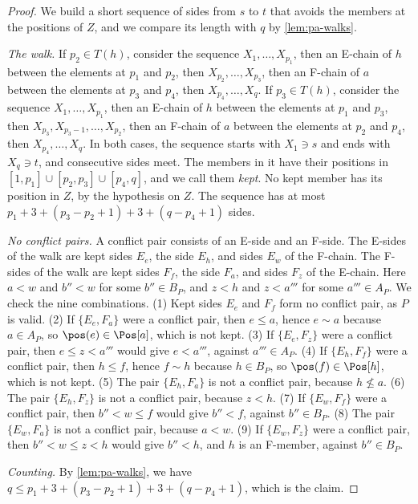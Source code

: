 \begin{proof}
We build a short sequence of sides from $s$ to $t$ that avoids the members at the positions of $Z$, and we compare its length with $q$ by \cref{lem:pa-walks}.

\emph{The walk.}
If $p_2 \in T(h)$, consider the sequence $X_1, \dots, X_{p_1}$, then an E-chain of $h$ between the elements at $p_1$ and $p_2$, then $X_{p_2}, \dots, X_{p_3}$, then an F-chain of $a$ between the elements at $p_3$ and $p_4$, then $X_{p_4}, \dots, X_q$.
If $p_3 \in T(h)$, consider the sequence $X_1, \dots, X_{p_1}$, then an E-chain of $h$ between the elements at $p_1$ and $p_3$, then $X_{p_3}, X_{p_3 - 1}, \dots, X_{p_2}$, then an F-chain of $a$ between the elements at $p_2$ and $p_4$, then $X_{p_4}, \dots, X_q$.
In both cases, the sequence starts with $X_1 \ni s$ and ends with $X_q \ni t$, and consecutive sides meet.
The members in it have their positions in $[1, p_1] \cup [p_2, p_3] \cup [p_4, q]$, and we call them \emph{kept}.
No kept member has its position in $Z$, by the hypothesis on $Z$.
The sequence has at most $p_1 + 3 + (p_3 - p_2 + 1) + 3 + (q - p_4 + 1)$ sides.

\emph{No conflict pairs.}
A conflict pair consists of an E-side and an F-side.
The E-sides of the walk are kept sides $E_e$, the side $E_h$, and sides $E_w$ of the F-chain.
The F-sides of the walk are kept sides $F_f$, the side $F_a$, and sides $F_z$ of the E-chain.
Here $a < w$ and $b'' < w$ for some $b'' \in B_P$, and $z < h$ and $z < a'''$ for some $a''' \in A_P$.
We check the nine combinations.
(1) Kept sides $E_e$ and $F_f$ form no conflict pair, as $P$ is valid.
(2) If $\{E_e, F_a\}$ were a conflict pair, then $e \leq a$, hence $e \sim a$ because $a \in A_P$, so $\pos(e) \in \Pos[a]$, which is not kept.
(3) If $\{E_e, F_z\}$ were a conflict pair, then $e \leq z < a'''$ would give $e < a'''$, against $a''' \in A_P$.
(4) If $\{E_h, F_f\}$ were a conflict pair, then $h \leq f$, hence $f \sim h$ because $h \in B_P$, so $\pos(f) \in \Pos[h]$, which is not kept.
(5) The pair $\{E_h, F_a\}$ is not a conflict pair, because $h \not\leq a$.
(6) The pair $\{E_h, F_z\}$ is not a conflict pair, because $z < h$.
(7) If $\{E_w, F_f\}$ were a conflict pair, then $b'' < w \leq f$ would give $b'' < f$, against $b'' \in B_P$.
(8) The pair $\{E_w, F_a\}$ is not a conflict pair, because $a < w$.
(9) If $\{E_w, F_z\}$ were a conflict pair, then $b'' < w \leq z < h$ would give $b'' < h$, and $h$ is an F-member, against $b'' \in B_P$.

\emph{Counting.}
By \cref{lem:pa-walks}, we have $q \leq p_1 + 3 + (p_3 - p_2 + 1) + 3 + (q - p_4 + 1)$, which is the claim.
\end{proof}

